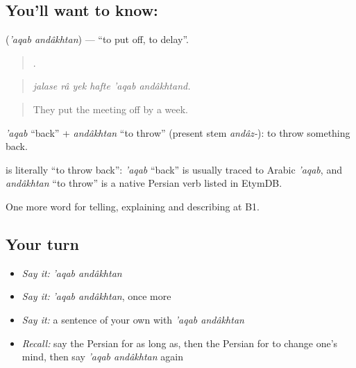 \subsection*{You'll want to know:  }
\textbf{ } (\emph{'aqab andâkhtan}) — \textquotedblleft{}to put off, to delay\textquotedblright{}.

\begin{quote}
     .
\end{quote}

\begin{quote}
\emph{jalase râ yek hafte 'aqab andâkhtand.}
\end{quote}

\begin{quote}
They put the meeting off by a week.
\end{quote}

\emph{'aqab} \textquotedblleft{}back\textquotedblright{} + \emph{andâkhtan} \textquotedblleft{}to throw\textquotedblright{} (present stem \emph{andâz-}): to throw something back.

\begin{cousinweb}
\textbf{ } is literally \textquotedblleft{}to throw back\textquotedblright{}: \emph{'aqab} \textquotedblleft{}back\textquotedblright{} is usually traced to Arabic \emph{'aqab}, and \emph{andâkhtan} \textquotedblleft{}to throw\textquotedblright{} is a native Persian verb listed in EtymDB.
\end{cousinweb}

\begin{grammarlens}[title={What you've built}]
One more word for telling, explaining and describing at B1.
\end{grammarlens}

\subsection*{Your turn}
\begin{itemize}
\raggedright
  \item \emph{Say it:} \emph{'aqab andâkhtan}
  \item \emph{Say it:} \emph{'aqab andâkhtan}, once more
  \item \emph{Say it:} a sentence of your own with \emph{'aqab andâkhtan}
  \item \emph{Recall:} say the Persian for as long as, then the Persian for to change one's mind, then say \emph{'aqab andâkhtan} again
\end{itemize}


